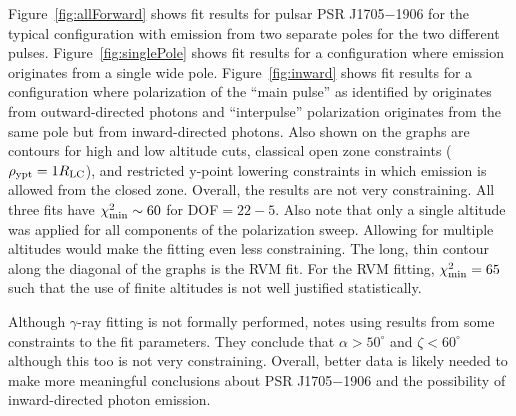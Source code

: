 Figure~\ref{fig:allForward}
shows fit results for pulsar PSR J1705$-$1906 
for the typical configuration with emission from
two separate poles for the two different pulses.
Figure~\ref{fig:singlePole}
shows fit results for a configuration where
emission originates from a single wide pole.
Figure~\ref{fig:inward}
shows fit results for a configuration where 
polarization of the ``main pulse'' as identified by \cite{weltevrede2007main}
originates from outward-directed photons and 
``interpulse'' polarization originates from the same pole 
but from inward-directed photons.
Also shown on the graphs are contours for high and low altitude cuts,
classical open zone constraints ($\rho_{\rm{ypt}}=1R_{\rm{LC}}$),
and restricted y-point lowering constraints in which emission is allowed from
the closed zone.
Overall, the results are not very constraining.
All three fits have $\chi^2_{\rm{min}}\sim60$ for DOF$=22-5$.
Also note that only a single altitude was applied for all components of the
polarization sweep.  Allowing for multiple altitudes would make the
fitting even less constraining.
The long, thin contour along the diagonal of the graphs 
is the RVM fit.  For the RVM fitting, $\chi^2_{\rm{min}}=65$ such
that the use of finite altitudes is not well justified statistically.

Although $\gamma$-ray fitting is not formally performed,
\cite{hou2014six} notes using results from \cite{Watters:2010jb}
some constraints to the fit parameters.
They conclude that $\alpha>50^\circ$ and $\zeta<60^\circ$
although this too is not very constraining.  Overall,
better data is likely needed to make more meaningful
conclusions about PSR J1705$-$1906 and the possibility of
inward-directed photon emission.

